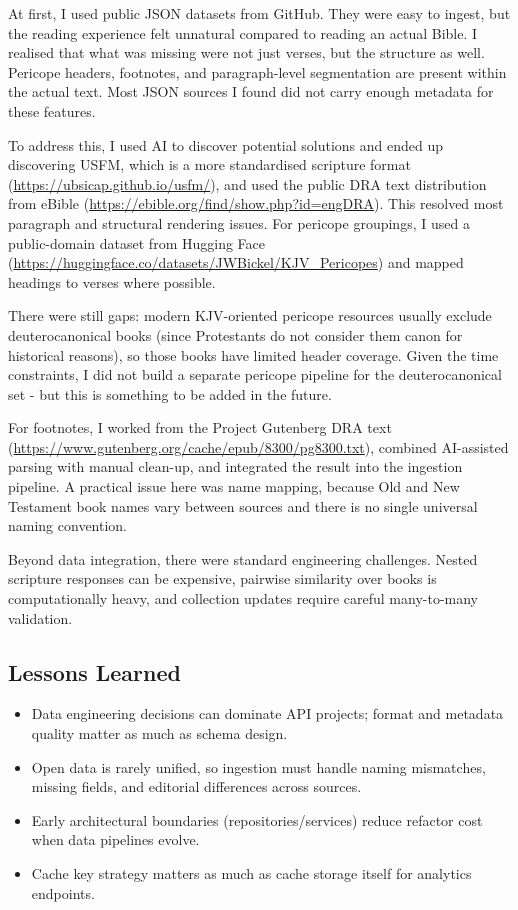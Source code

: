 \documentclass[11pt,a4paper]{article}
\begin{document}
At first, I used public JSON datasets from GitHub. They were easy to ingest, but the reading experience felt unnatural compared to reading an actual Bible. I realised that what was missing were not just verses, but the structure as well. Pericope headers, footnotes, and paragraph-level segmentation are present within the actual text. Most JSON sources I found did not carry enough metadata for these features.

To address this, I used AI to discover potential solutions and ended up discovering USFM, which is a more standardised scripture format (\url{https://ubsicap.github.io/usfm/}), and used the public DRA text distribution from eBible (\url{https://ebible.org/find/show.php?id=engDRA}). This resolved most paragraph and structural rendering issues. For pericope groupings, I used a public-domain dataset from Hugging Face (\url{https://huggingface.co/datasets/JWBickel/KJV_Pericopes}) and mapped headings to verses where possible.

There were still gaps: modern KJV-oriented pericope resources usually exclude deuterocanonical books (since Protestants do not consider them canon for historical reasons), so those books have limited header coverage. Given the time constraints, I did not build a separate pericope pipeline for the deuterocanonical set - but this is something to be added in the future.

For footnotes, I worked from the Project Gutenberg DRA text (\url{https://www.gutenberg.org/cache/epub/8300/pg8300.txt}), combined AI-assisted parsing with manual clean-up, and integrated the result into the ingestion pipeline. A practical issue here was name mapping, because Old and New Testament book names vary between sources and there is no single universal naming convention.

Beyond data integration, there were standard engineering challenges. Nested scripture responses can be expensive, pairwise similarity over books is computationally heavy, and collection updates require careful many-to-many validation.

\subsection{Lessons Learned}
\begin{itemize}[leftmargin=*]
	\item Data engineering decisions can dominate API projects; format and metadata quality matter as much as schema design.
	\item Open data is rarely unified, so ingestion must handle naming mismatches, missing fields, and editorial differences across sources.
	\item Early architectural boundaries (repositories/services) reduce refactor cost when data pipelines evolve.
	\item Cache key strategy matters as much as cache storage itself for analytics endpoints.
\end{itemize}
\end{document}
